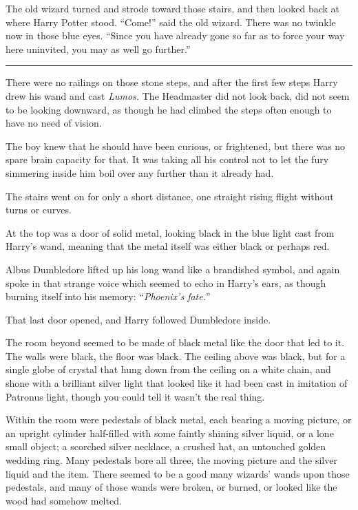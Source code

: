 The old wizard turned and strode toward those stairs, and then looked back at where Harry Potter stood. ``Come!'' said the old wizard. There was no twinkle now in those blue eyes. ``Since you have already gone so far as to force your way here uninvited, you may as well go further.''

\begin{center}\rule{3in}{0.4pt}\end{center}

There were no railings on those stone steps, and after the first few steps Harry drew his wand and cast \emph{Lumos.} The Headmaster did not look back, did not seem to be looking downward, as though he had climbed the steps often enough to have no need of vision.

The boy knew that he should have been curious, or frightened, but there was no spare brain capacity for that. It was taking all his control not to let the fury simmering inside him boil over any further than it already had.

The stairs went on for only a short distance, one straight rising flight without turns or curves.

At the top was a door of solid metal, looking black in the blue light cast from Harry's wand, meaning that the metal itself was either black or perhaps red.

Albus Dumbledore lifted up his long wand like a brandished symbol, and again spoke in that strange voice which seemed to echo in Harry's ears, as though burning itself into his memory: ``\emph{Phoenix's fate.}''

That last door opened, and Harry followed Dumbledore inside.

The room beyond seemed to be made of black metal like the door that led to it. The walls were black, the floor was black. The ceiling above was black, but for a single globe of crystal that hung down from the ceiling on a white chain, and shone with a brilliant silver light that looked like it had been cast in imitation of Patronus light, though you could tell it wasn't the real thing.

Within the room were pedestals of black metal, each bearing a moving picture, or an upright cylinder half-filled with some faintly shining silver liquid, or a lone small object; a scorched silver necklace, a crushed hat, an untouched golden wedding ring. Many pedestals bore all three, the moving picture and the silver liquid and the item. There seemed to be a good many wizards' wands upon those pedestals, and many of those wands were broken, or burned, or looked like the wood had somehow melted.

